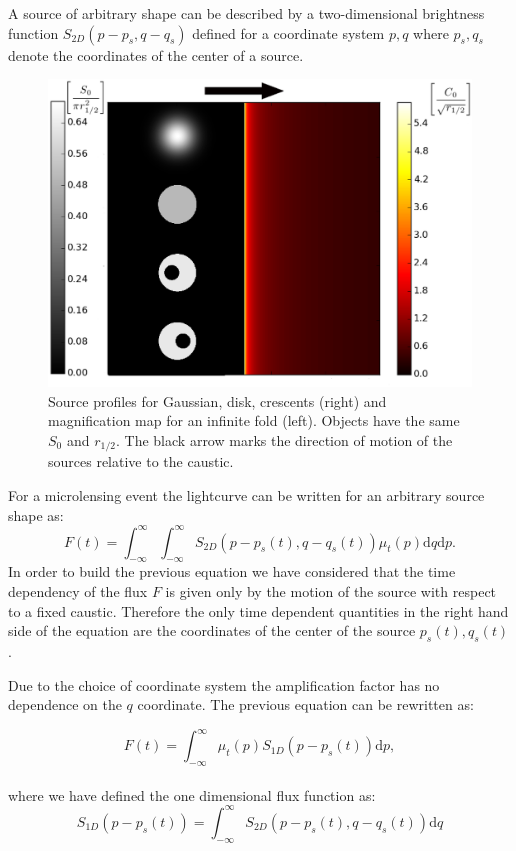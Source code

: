 \documentclass[usenatbib]{mn2e}
\begin{document}
A source of arbitrary shape can be described by a two-dimensional brightness function $S_{2D}(p - p_s, q - q_s)$ defined for a coordinate system $p,q$ where $p_s, q_s$ denote the coordinates of the center of a source.

\begin{figure}
\includegraphics[width = .49\textwidth]{figures/infinite_fold_ar.eps}
\caption{\label{fig:infinite_fold} Source profiles for Gaussian, disk,
  crescents (right) and magnification map for an infinite fold
  (left). Objects have the same $S_{0}$ and $r_{1/2}$. The black arrow marks the direction of motion of the
sources relative to the caustic.}
\end{figure}

For a microlensing event the lightcurve can be written for an
arbitrary source shape as:
\begin{equation}
 F(t) = \int_{-\infty}^\infty \int_{-\infty}^\infty S_{2D}(p-p_s(t), q-q_s(t)) \mu_t(p) \mathrm{d}q \mathrm{d}p.
 \label{eqn:ft2d}
\end{equation}
In order to build the previous equation we have considered that the
time dependency of the flux $F$ is given only by the motion of the
source with respect to a fixed caustic. Therefore the only time
dependent quantities in the right hand side of the equation are the
coordinates of the center of the source $p_s(t),q_s(t)$.

Due to the choice of coordinate system the amplification factor 
has no dependence on the $q$ coordinate. The previous equation can be rewritten as:

\begin{equation}
 F(t) 
= \int_{-\infty}^\infty  \mu_t(p) S_{1D}\left(p-p_s(t)\right) \mathrm{d}p,
\label{eqn:ft}
\end{equation}
\\
where we have defined the one dimensional flux function as:
\begin{equation}
 S_{1D}(p-p_s(t)) = \int_{-\infty}^\infty S_{2D}(p-p_s(t), q-q_s(t)) \mathrm{d}q
\end{equation}
\end{document}
